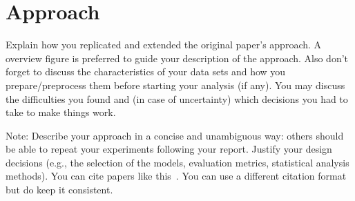 
\section{Approach}
\label{sec:approach}

Explain how you replicated and extended the original paper's approach. A overview figure is preferred to guide your description of the approach. Also don't forget to discuss the characteristics of your data sets and how you prepare/preprocess them before starting your analysis (if any).
You may discuss the difficulties you found and (in case of uncertainty) which decisions you had to take to make things work.

Note: Describe your approach in a concise and unambiguous way: others should be able to repeat your experiments following your report.
Justify your design decisions (e.g., the selection of the models, evaluation metrics, statistical analysis methods). 
You can cite papers like this~\cite{he2016experience}. You can use a different citation format but do keep it consistent.

